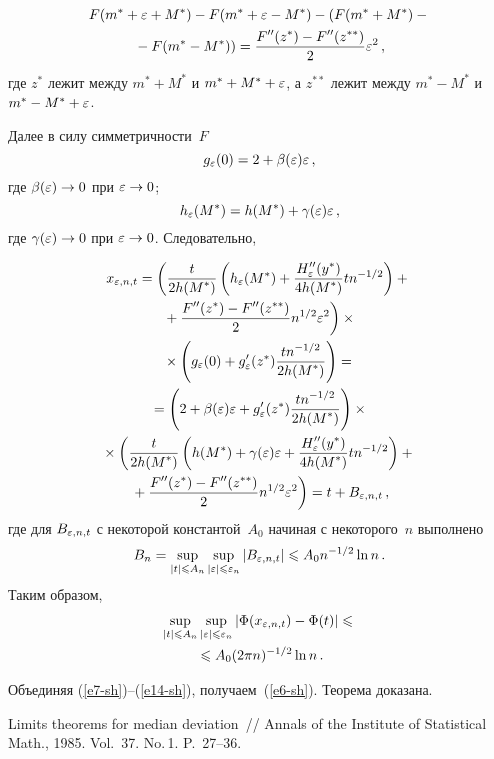 \begin{multicols}{2}
{}

\noindent
\begin{multline*}
F(m^*+\varepsilon+M^*)-F(m^*+\varepsilon-M^*)-(F(m^*+M^*)-{}\\
{}-F(m^*-M^*))=\displaystyle\frac{\displaystyle F''(z^*)-F''(z^{**})\mathstrut}{\displaystyle 2\mathstrut}\varepsilon^2\,,
\end{multline*}
где $z^*$ лежит между $m^*+M^*$ и $m^*+M^*+\varepsilon$, 
а $z^{**}$ лежит между $m^*-M^*$ и $m^*-M^*+\varepsilon$.

Далее в силу симметричности~$F$
$$
g_\varepsilon(0)=2+\beta(\varepsilon)\varepsilon\,,
$$ 
где $\beta(\varepsilon)\rightarrow 0$  при $\eps\hm\rightarrow 0$;
$$
h_\varepsilon(M^*)=h(M^*)+\gamma(\varepsilon)\varepsilon\,,
$$
где $\gamma(\varepsilon)\rightarrow0$  при $\eps\hm\rightarrow0$.
Следовательно,

\pagebreak

\noindent
\begin{multline*}
x_{\varepsilon,n,t}=\left(\displaystyle\frac{\displaystyle t\mathstrut}{\displaystyle 2h(M^*)\mathstrut}\left(h_\varepsilon(M^*)+
\displaystyle\frac{\displaystyle H''_\varepsilon(y^*)\mathstrut}{\displaystyle 4h(M^*)\mathstrut}tn^{-1/2}\right)+{}\right.\\
\left.{}+
\displaystyle\frac{\displaystyle F''(z^*)-F''(z^{**})\mathstrut}{\displaystyle 2\mathstrut}n^{1/2}\varepsilon^2\right)\times{}\\
{}\times\left(g_\varepsilon(0)+g'_\varepsilon(z^*)\displaystyle\frac{\displaystyle tn^{-1/2}\mathstrut}{\displaystyle 2h(M^*)\mathstrut}\right)= {}\\
{}=
\left(2+\beta(\varepsilon)\varepsilon+g'_\varepsilon(z^*)\displaystyle\frac{\displaystyle tn^{-1/2}\mathstrut}{\displaystyle 2h(M^*)\mathstrut}\right)\times{}\\
{}\times\left(\displaystyle\frac{\displaystyle t\mathstrut}{\displaystyle 2h(M^*)\mathstrut}\left(h(M^*)+\gamma(\varepsilon)\varepsilon+
\displaystyle\frac{\displaystyle H''_\varepsilon(y^*)\mathstrut}{\displaystyle 4h(M^*)\mathstrut}tn^{-1/2}\right)+{}\right.\\
\left.{}+
\displaystyle\frac{\displaystyle F''(z^*)-F''(z^{**})\mathstrut}{\displaystyle 2\mathstrut}n^{1/2}\varepsilon^2\right)
=t+B_{\varepsilon,n,t}\,,
\end{multline*}
где для $B_{\varepsilon,n,t}$ с некоторой константой~$A_0$ начиная с некоторого~$n$ выполнено
$$
B_n=\sup\limits_{\left\vert t\right\vert\leqslant A_n}\sup\limits_{\left\vert\varepsilon\right\vert\leqslant \varepsilon_n}\left\vert B_{\varepsilon,n,t}\right\vert\leqslant A_0n^{-1/2}\ln n\,.
$$
Таким образом,
\begin{multline}
\sup\limits_{\left\vert t\right\vert\leqslant A_n}\sup\limits_{\left\vert\varepsilon\right\vert\leqslant
\varepsilon_n}\left\vert\Phi(x_{\varepsilon,n,t})-\Phi(t)\right\vert\leqslant{}\\
{}\leqslant  A_0(2\pi n)^{-1/2}\ln n\,.
\label{e14-sh}
\end{multline}

Объединяя (\ref{e7-sh})--(\ref{e14-sh}), получаем~(\ref{e6-sh}). Теорема доказана.

{\small\frenchspacing
{%
\begin{thebibliography}{9}

Limits theorems for median deviation~// Annals of the Institute of
Statistical Math., 1985. Vol.~37. No.\,1. P.~27--36.
\par


\end{thebibliography}}}
\end{multicols}
